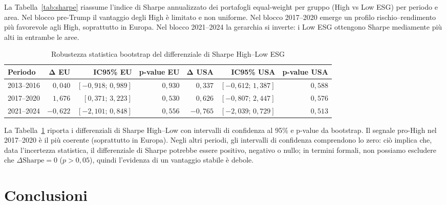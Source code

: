 \documentclass[12pt,a4paper]{article}
\begin{document}
La Tabella~\ref{tab:sharpe} riassume l'indice di Sharpe annualizzato dei portafogli equal-weight per gruppo (High vs Low ESG) per periodo e area. Nel blocco pre-Trump il vantaggio degli High è limitato e non uniforme. Nel blocco 2017--2020 emerge un profilo rischio--rendimento più favorevole agli High, soprattutto in Europa. Nel blocco 2021--2024 la gerarchia si inverte: i Low ESG ottengono Sharpe mediamente più alti in entrambe le aree.

\begin{table}[H]
\centering
\caption{Robustezza statistica bootstrap del differenziale di Sharpe High--Low ESG}
\label{tab:bootstrap}
\footnotesize
\setlength{\tabcolsep}{3pt}
\begin{tabular}{lrrrrrr}
\toprule
\textbf{Periodo} & $\boldsymbol{\Delta}$\textbf{ EU} & \textbf{IC95\% EU} & \textbf{p-value EU} & $\boldsymbol{\Delta}$\textbf{ USA} & \textbf{IC95\% USA} & \textbf{p-value USA} \\
\midrule
2013--2016 & $0{,}040$ & $[-0{,}918;\,0{,}989]$ & $0{,}930$ & $0{,}337$ & $[-0{,}612;\,1{,}387]$ & $0{,}588$ \\
2017--2020 & $1{,}676$ & $[0{,}371;\,3{,}223]$ & $0{,}530$ & $0{,}626$ & $[-0{,}807;\,2{,}447]$ & $0{,}576$ \\
2021--2024 & $-0{,}622$ & $[-2{,}101;\,0{,}848]$ & $0{,}556$ & $-0{,}765$ & $[-2{,}039;\,0{,}729]$ & $0{,}513$ \\
\bottomrule
\end{tabular}
\end{table}

La Tabella~\ref{tab:bootstrap} riporta i differenziali di Sharpe High--Low con intervalli di confidenza al 95\% e p-value da bootstrap. Il segnale pro-High nel 2017--2020 è il più coerente (soprattutto in Europa). Negli altri periodi, gli intervalli di confidenza comprendono lo zero: ciò implica che, data l'incertezza statistica, il differenziale di Sharpe potrebbe essere positivo, negativo o nullo; in termini formali, non possiamo escludere che $\Delta\mathrm{Sharpe}=0$ ($p>0{,}05$), quindi l'evidenza di un vantaggio stabile è debole.

\section{Conclusioni}
\end{document}
